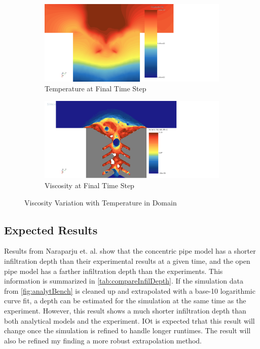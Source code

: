 \documentclass[conf]{new-aiaa}
\begin{document}
\begin{figure}[!htb]
\centering
\begin{subfigure}{0.4\textwidth}
\includegraphics[scale=0.2]{Figures/TemperatureView_image_00270.png} 
\caption{Temperature at Final Time Step}
\label{fig:Temper}
\end{subfigure}
\begin{subfigure}{0.4\textwidth}
\includegraphics[scale=0.2]{Figures/Viscosity_View_image_00270.png}
\caption{Viscosity at Final Time Step}
\label{fig:viscVary}
\end{subfigure}

\caption{Viscosity Variation with Temperature in Domain}
\label{fig:TempAndVisc}
\end{figure}

\subsection{Expected Results}
Results from Naraparju et. al. \cite{Naraparaju2019} show that the concentric pipe model has a shorter infiltration depth than their experimental results at a given time, and the open pipe model has a farther infiltration depth than the experiments. This information is summarized in \ref{tab:compareInfilDepth}. If the simulation data from \ref{fig:analytBench} is cleaned up and extrapolated with a base-10 logarithmic curve fit, a depth can be estimated for the simulation at the same time as the experiment. However, this result shows a much shorter infiltration depth than both analytical models and the experiment. IOt is expected trhat this result will change once the simulation is refined to handle longer runtimes. The result will also be refined my finding a more robust extrapolation method.
\end{document}
